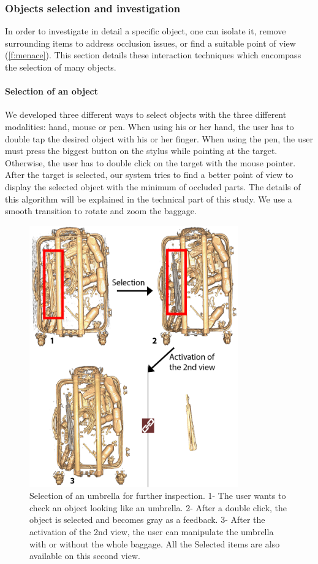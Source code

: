 \subsubsection{ Objects selection and investigation}
In order to investigate in detail a specific object, one can isolate it, remove surrounding items to address occlusion issues, or find a suitable point of view (\autoref{f:menace}). This section details these interaction techniques which encompass the selection of many objects.


\paragraph{	Selection of an object}
We developed three different ways to select objects with the three different modalities: hand, mouse or pen. When using his or her hand, the user has to double tap the desired object with his or her finger. When using the pen, the user must press the biggest button on the stylus while pointing at the target. Otherwise, the user has to double click on the target with the mouse pointer. After the target is selected, our system tries to find a better point of view to display the selected object with the minimum of occluded parts. The details of this algorithm will be explained in the technical part of this study. We use a smooth transition to rotate and zoom the baggage. 


\begin{figure}
\centering   
	\includegraphics[width=9cm]{Figures/selection.png}
	\caption[Selection of an umbrella for further inspection.]{ Selection of an umbrella for further inspection.  1- The user wants to check an object looking like an umbrella. 2- After a double click, the object is selected and becomes gray as a feedback. 3- After the activation of the 2nd view, the user can manipulate the umbrella with or without the whole baggage. All the Selected items are also available on this second view. }
	\label{f:selection}
\end{figure}



